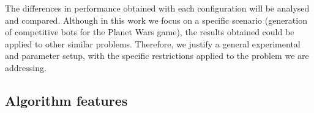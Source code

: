 \documentclass[runningheads,a4paper]{llncs}
\begin{document}
The differences in performance obtained with each configuration will be analysed and compared. 
Although in this work we focus on a specific scenario (generation of competitive bots for the Planet Wars game), the results obtained could be applied to other similar problems. Therefore, we justify a general experimental and parameter setup, with the specific restrictions applied to the problem we are addressing. 


\subsection{Algorithm features}

 

\end{document}
